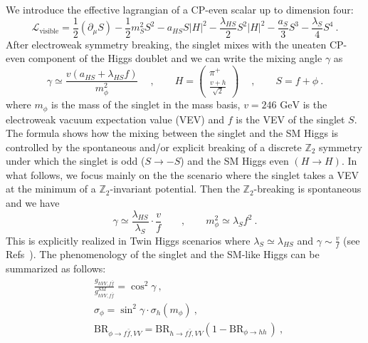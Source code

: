 We introduce the effective lagrangian of a CP-even scalar up to dimension four:
\begin{equation}
\mathcal{L}_{\text{visible}}=\frac{1}{2}(\partial_\mu S)-\frac{1}{2} m_S^2 S^2-a_{HS} S\vert H\vert^2-\frac{\lambda_{HS}}{2} S^2\vert H\vert^2-\frac{a_S}{3} S^3-\frac{\lambda_S}{4} S^4\ .\label{eq:everybody}
\end{equation}
After electroweak symmetry breaking, the singlet mixes with the uneaten CP-even component of the Higgs doublet and we can write the mixing angle $\gamma$ as
\begin{equation}
\gamma\simeq\frac{v(a_{HS}+\lambda_{HS} f)}{m_\phi^2}\quad\ ,\qquad H=\begin{pmatrix}\pi^+\\ \frac{v+h}{\sqrt{2}}\end{pmatrix}\quad\ ,\qquad S=f+\phi\ .
\end{equation}   
where $m_\phi$ is the mass of the singlet in the mass basis, $v=246\text{ GeV}$ is the electroweak vacuum expectation value (VEV) and $f$ is the VEV of the singlet $S$. The formula shows how the mixing between the singlet and the SM Higgs is controlled by the spontaneous and/or explicit breaking of a discrete $\mathbb{Z}_2$ symmetry under which the singlet is odd ($S\to -S$) and the SM Higgs even $(H\to H)$.  In what follows, we focus mainly on the the scenario where the singlet takes a VEV at the minimum of a $\mathbb{Z}_2$-invariant potential. Then the $\mathbb{Z}_2$-breaking is spontaneous and we have
\begin{equation}
\gamma\simeq \frac{\lambda_{HS}}{\lambda_S}\cdot\frac{v}{f}\qquad ,\qquad m_\phi^2\simeq \lambda_S f^2\ . \label{eq:mixing}
\end{equation} 
 This is explicitly realized in Twin Higgs scenarios where $\lambda_S\simeq \lambda_{HS}$ and $\gamma\sim \frac{v}{f}$ (see Refs~\cite{Chacko:2005pe,Barbieri:2005ri}). The phenomenology of the singlet and the SM-like Higgs can be summarized as follows:
\begin{align}
&\frac{g_{hVV,f\bar f}}{g_{hVV,f\bar f}^{SM}}=\cos^2\gamma \label{eq:SMHiggs}\ ,\\
&\sigma_\phi=\sin^2\gamma\cdot \sigma_{h}(m_\phi)\label{eq:Sproduction}\ ,\\
&\text{BR}_{\phi\to f\bar{f},VV}=\text{BR}_{h\to f\bar{f},VV}(1-\text{BR}_{\phi\to hh\ \label{eq:SBR}
})\ ,
\end{align}
